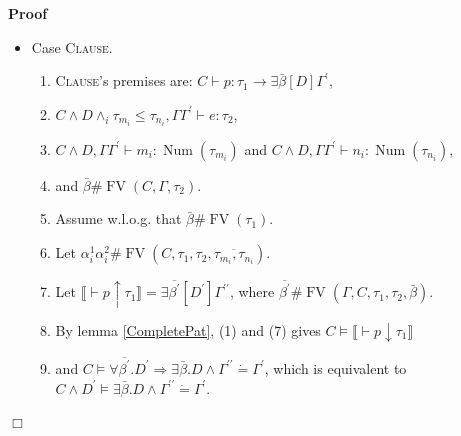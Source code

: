 \documentclass{article}
\newcommand{\assign}{:=}
\newcommand{\tmname}[1]{\textsc{#1}}
\newcommand{\tmop}[1]{\ensuremath{\operatorname{#1}}}
\newcommand{\tmstrong}[1]{\textbf{#1}}
\newenvironment{proof}{\noindent\textbf{Proof\ }}{\hspace*{\fill}$\Box$\medskip}
\begin{document}
\begin{proof}
\begin{itemize}
\begin{enumerate}
      \item Let $\mathcal{I}=\mathcal{I}_1 \mathcal{I}_2 ; \chi \assign
      \exists \bar{\alpha} .D [\beta \assign \delta]$, where $\chi \#
      \tmop{PV} (\Gamma, \Phi_1, \Phi_2)$. (6) gives $\mathcal{I}, C \vDash
      (\forall \beta . \chi (\beta) \Rightarrow \Phi_1) \wedge (\exists \beta
      . \chi (\beta)) \wedge \Phi_2$, which is $\mathcal{I}, {\nobreak} C
      \vDash \left\llbracket \Gamma \vdash \text{{\tmstrong{let rec}}} x = e_1
      \text{{\tmstrong{in}}} e_2 : \tau \right\rrbracket$.
    \end{enumerate}
    \item Case {\tmname{Clause}}.
    \begin{enumerate}
      \item {\tmname{Clause}}'s premises are: $C \vdash p : \tau_1
      \longrightarrow \exists \bar{\beta} [D] \Gamma^{\prime}$,
      
      \item $C \wedge D \wedge_i \tau_{m_i} \leq \tau_{n_i}, \Gamma
      \Gamma^{\prime} \vdash e : \tau_2$,
      
      \item $C \wedge D, \Gamma \Gamma^{\prime} \vdash m_i : \tmop{Num}
      (\tau_{m_i})$ and $C \wedge D, \Gamma \Gamma^{\prime} \vdash n_i :
      \tmop{Num} (\tau_{n_i})$,
      
      \item and $\bar{\beta} \# \tmop{FV} (C, \Gamma, \tau_2)$.
      
      \item Assume w.l.o.g. that $\bar{\beta} \# \tmop{FV} (\tau_1)$.
      
      \item Let $\alpha_i^1 \alpha_i^2 \# \tmop{FV} (C, \tau_1, \tau_2,
      \overline{\tau_{m_i}, \tau_{n_i}})$.
      
      \item Let $\llbracket \vdash p \uparrow \tau_1 \rrbracket = \exists
      \overline{\beta^{\prime}} [D^{\prime}] \Gamma^{\prime\prime}$, where
      $\overline{\beta^{\prime}} \# \tmop{FV} (\Gamma, C, \tau_1, \tau_2,
      \bar{\beta})$.
      
      \item By lemma \ref{CompletePat}, (1) and (7) gives $C \vDash \llbracket
      \vdash p \downarrow \tau_1 \rrbracket$
      
      \item and $C \vDash \forall \overline{\beta^{\prime}} .D^{\prime}
      \Rightarrow \exists \bar{\beta} .D \wedge \Gamma^{\prime\prime} \dot{=}
      \Gamma^{\prime}$, which is equivalent to $C \wedge D^{\prime} \vDash
      \exists \bar{\beta} .D \wedge \Gamma^{\prime\prime} \dot{=}
      \Gamma^{\prime}$.
      

\end{enumerate}
\end{itemize}
\end{proof}
\end{document}
